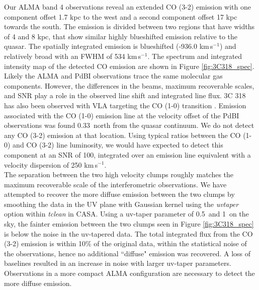 \documentclass[twocolumn]{aastex63}
\newcommand{\kms}{km\,s$^{-1}$}
\begin{document}
Our ALMA band 4 observations reveal an extended CO (3-2) emission with one component offset 1.7 kpc to the west and a second component offset 17 kpc towards the south. The emission is divided between two regions that have widths of 4 and 8 kpc, that show similar highly blueshifted emission relative to the quasar. The spatially integrated emission is blueshifted (-936.0 \kms) and relatively broad with an FWHM of 534 \kms. The spectrum and integrated intensity map of the detected CO emission are shown in Figure \ref{fig:3C318_spec}. Likely the ALMA and PdBI observations trace the same molecular gas components. However, the differences in the beams, maximum recoverable scales, and SNR play a role in the observed line shift and integrated line flux. 3C 318 has also been observed with VLA targeting the CO (1-0) transition \citep{Heywood13}. Emission associated with the CO (1-0) emission line at the velocity offset of the PdBI observations was found 0.33\arcsec\ north from the quasar continuum. We do not detect any CO (3-2) emission at that location. Using typical ratios between the CO (1-0) and CO (3-2) line luminosity, we would have expected to detect this component at an SNR of 100, integrated over an emission line equivalent with a velocity dispersion of 250 \kms. \\

The separation between the two high velocity clumps roughly matches the maximum recoverable scale of the interferometric observations. We have attempted to recover the more diffuse emission between the two clumps by smoothing the data in the UV plane with Gaussian kernel using the \textit{uvtaper} option within \textit{tclean} in CASA. Using a uv-taper parameter of 0.5\arcsec\ and 1\arcsec\ on the sky, the fainter emission between the two clumps seen in Figure \ref{fig:3C318_spec} is below the noise in the uv-tapered data. The total integrated flux from the CO (3-2) emission is within 10\% of the original data, within the statistical noise of the observations, hence no additional ``diffuse" emission was recovered. A loss of baselines resulted in an increase in noise with larger uv-taper parameters. Observations in a more compact ALMA configuration are necessary to detect the more diffuse emission. \\
\end{document}
